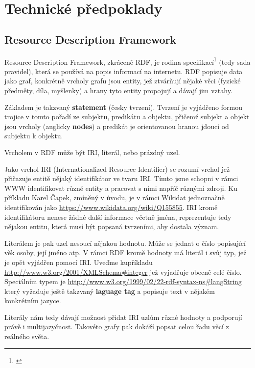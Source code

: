 \chapter{Technické předpoklady}

\section{Resource Description Framework}
Resource Description Framework, zkráceně RDF, je rodina specifikací\footnote{\citet{Raimond:14:RP}} (tedy sada pravidel), která se používá na popis informací na internetu. RDF popisuje data jako graf, konkrétně vrcholy grafu jsou entity, jež ztvárňují nějaké věci (fyzické předměty, díla, myšlenky) a hrany tyto entity propojují a dávají jim vztahy.

Základem je takzvaný \textbf{statement} (česky tvrzení). Tvrzení je vyjádřeno formou trojice v tomto pořadí ze subjektu, predikátu a objektu, přičemž subjekt a objekt jsou vrcholy (anglicky \textbf{nodes}) a predikát je orientovanou hranou jdoucí od subjektu k objektu.

Vrcholem v RDF může být IRI, literál, nebo prázdný uzel.

\medskip

Jako vrchol IRI (Internationalized Resource Identifier) se rozumí vrchol jež přiřazuje entitě nějaký identifikátor ve tvaru IRI. Tímto jsme schopni v rámci WWW identifikovat různé entity a pracovat s nimi napříč různými zdroji. Ku příkladu Karel Čapek, zmíněný v úvodu, je v rámci Wikidat jednoznačně identifikován jako \url{https://www.wikidata.org/wiki/Q155855}. IRI kromě identifikátoru nenese žádné další informace včetně jména, reprezentuje tedy nějakou entitu, která musí být popsaná tvrzeními, aby dostala význam.

\medskip

Literálem je pak uzel nesoucí nějakou hodnotu. Může se jednat o číslo popisující věk osoby, její jméno atp. V rámci RDF kromě hodnoty má literál i svůj typ, jež je opět vyjádřen pomocí IRI. Uveďme kupříkladu \url{http://www.w3.org/2001/XMLSchema#integer} jež vyjadřuje obecně celé číslo. Speciálním typem je \url{http://www.w3.org/1999/02/22-rdf-syntax-ns#langString} který vyžaduje ještě takzvaný \textbf{laguage tag} a popisuje text v nějakém konkrétním jazyce.

\medskip

Literály nám tedy dávají možnost přidat IRI uzlům různé hodnoty a podporují právě i multijazyčnost. Takovéto grafy pak dokáží popsat celou řadu věcí z reálného světa.

